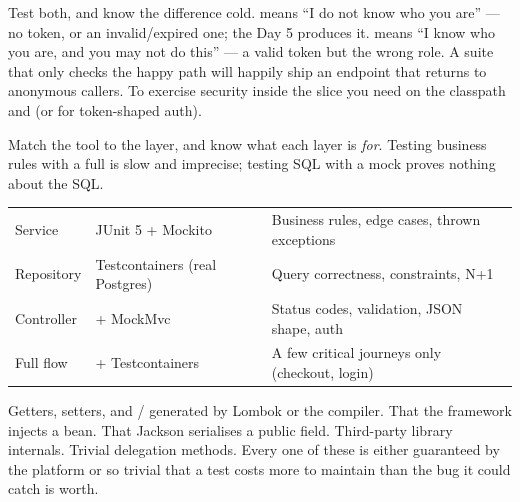 \begin{secwarn}[401 is not 403]
Test both, and know the difference cold.  means ``I do not know who you are'' --- no token, or an invalid/expired one; the Day 5  produces it.  means ``I know who you are, and you may not do this'' --- a valid token but the wrong role. A suite that only checks the happy path will happily ship an endpoint that returns  to anonymous callers. To exercise security inside the slice you need  on the classpath and  (or  for token-shaped auth).
\end{secwarn}


 Match the tool to the layer, and know what each layer is \emph{for}. Testing business rules with a full  is slow and imprecise; testing SQL with a mock proves nothing about the SQL.

\begin{center}\small
\begin{tabularx}{\linewidth}{@{}L{22mm} L{40mm} X@{}}
 &  & \\\midrule
Service & JUnit 5 + Mockito & Business rules, edge cases, thrown exceptions\\
Repository & Testcontainers (real Postgres) & Query correctness, constraints, N+1\\
Controller &  + MockMvc & Status codes, validation, JSON shape, auth\\
Full flow &  + Testcontainers & A few critical journeys only (checkout, login)\\
\end{tabularx}\end{center}

 Getters, setters, and / generated by Lombok or the compiler. That the framework injects a bean. That Jackson serialises a public field. Third-party library internals. Trivial delegation methods. Every one of these is either guaranteed by the platform or so trivial that a test costs more to maintain than the bug it could catch is worth.

